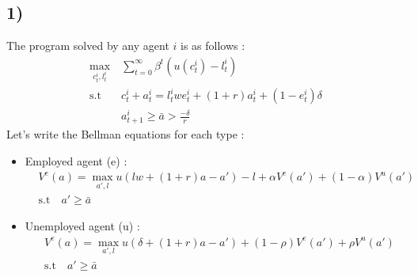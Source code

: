 \documentclass{article}
\begin{document}
\subsection*{1)}
The program solved by any agent $i$ is as follows : 
$$\begin{aligned}
    \max_{c^i_t,l^i_t}&\sum_{t=0}^{\infty}\beta^t(u(c^i_t)-l^i_t)\\
    \text{s.t} \quad &c^i_t+a^i_t = l^i_twe^i_t+(1+r)a^i_t+(1-e^i_t)\delta\\
    &a^i_{t+1}\geq \bar{a}>\frac{-\delta }{r}
\end{aligned}$$
Let's write the Bellman equations for each type : 
\begin{itemize}
    \item Employed agent (e) : 
    $$\begin{aligned}
        &V^e(a) = \max _{a',l} u(lw+(1+r)a-a')-l+\alpha V^e(a')+(1-\alpha) V^u(a')\\
        &\text{s.t} \quad a'\geq \bar{a}
    \end{aligned}$$
    \item Unemployed agent (u) : 
    $$\begin{aligned}
        &V^e(a) = \max _{a',l} u(\delta +(1+r)a-a')+(1-\rho) V^e(a')+\rho V^u(a')\\
        &\text{s.t} \quad a'\geq \bar{a}
    \end{aligned}$$
\end{itemize}
\end{document}
